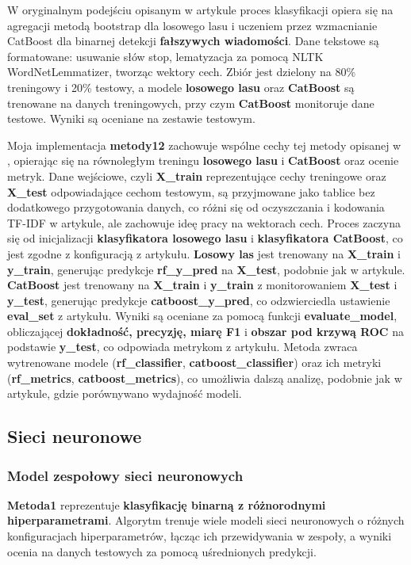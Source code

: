 W oryginalnym podejściu opisanym w artykule \cite{metoda12} proces klasyfikacji opiera się na agregacji metodą bootstrap dla losowego lasu i uczeniem przez wzmacnianie CatBoost dla binarnej detekcji \textbf{fałszywych wiadomości}. Dane tekstowe są formatowane: usuwanie słów stop, lematyzacja za pomocą NLTK WordNetLemmatizer, tworząc wektory cech. Zbiór jest dzielony na 80\% treningowy i 20\% testowy, a modele \textbf{losowego lasu} oraz \textbf{CatBoost} są trenowane na danych treningowych, przy czym \textbf{CatBoost} monitoruje dane testowe. Wyniki są oceniane na zestawie testowym.

Moja implementacja \textbf{metody12} zachowuje wspólne cechy tej metody opisanej w \cite{metoda12}, opierając się na równoległym treningu \textbf{losowego lasu} i \textbf{CatBoost} oraz ocenie metryk. Dane wejściowe, czyli \textbf{X\_train} reprezentujące cechy treningowe oraz \textbf{X\_test} odpowiadające cechom testowym, są przyjmowane jako tablice bez dodatkowego przygotowania danych, co różni się od oczyszczania i kodowania TF-IDF w artykule, ale zachowuje ideę pracy na wektorach cech. Proces zaczyna się od inicjalizacji \textbf{klasyfikatora losowego lasu} i \textbf{klasyfikatora CatBoost}, co jest zgodne z konfiguracją z artykułu. \textbf{Losowy las} jest trenowany na \textbf{X\_train} i \textbf{y\_train}, generując predykcje \textbf{rf\_y\_pred} na \textbf{X\_test}, podobnie jak w artykule. \textbf{CatBoost} jest trenowany na \textbf{X\_train} i \textbf{y\_train} z monitorowaniem \textbf{X\_test} i \textbf{y\_test}, generując predykcje \textbf{catboost\_y\_pred}, co odzwierciedla ustawienie \textbf{eval\_set} z artykułu. Wyniki są oceniane za pomocą funkcji \textbf{evaluate\_model}, obliczającej \textbf{dokładność, precyzję, miarę F1} i \textbf{obszar pod krzywą ROC} na podstawie \textbf{y\_test}, co odpowiada metrykom z artykułu. Metoda zwraca wytrenowane modele (\textbf{rf\_classifier}, \textbf{catboost\_classifier}) oraz ich metryki (\textbf{rf\_metrics}, \textbf{catboost\_metrics}), co umożliwia dalszą analizę, podobnie jak w artykule, gdzie porównywano wydajność modeli.

\subsection{Sieci neuronowe}
\subsubsection{Model zespołowy sieci neuronowych}
\textbf{Metoda1} reprezentuje \textbf{klasyfikację binarną z różnorodnymi hiperparametrami}. Algorytm trenuje wiele modeli sieci neuronowych o różnych konfiguracjach hiperparametrów, łącząc ich przewidywania w zespoły, a wyniki ocenia na danych testowych za pomocą uśrednionych predykcji.

